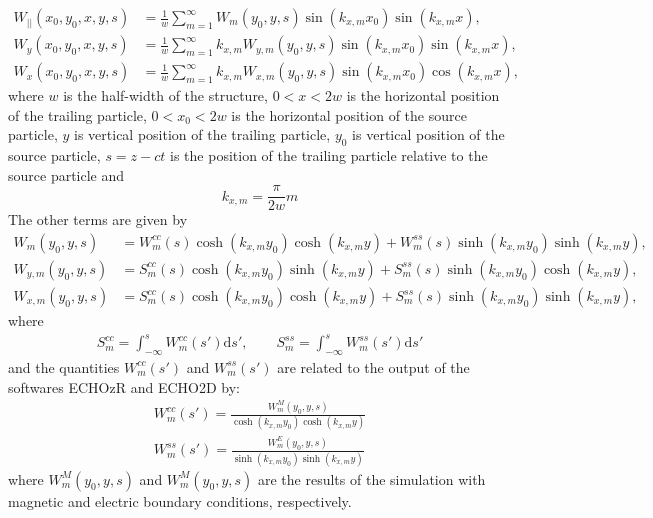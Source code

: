 \begin{apendicesenv}
    \begin{align}
		W_{||}(x_0,y_0,x,y,s) &= \frac1w\sum_{m=1}^\infty W_m(y_0,y,s)\sin(k_{x,m}x_0)\sin(k_{x,m}x), \\
		W_y(x_0,y_0,x,y,s) &= \frac1w\sum_{m=1}^\infty k_{x,m}W_{y,m}(y_0,y,s)\sin(k_{x,m}x_0)\sin(k_{x,m}x), \\
		W_x(x_0,y_0,x,y,s) &= \frac1w\sum_{m=1}^\infty k_{x,m}W_{x,m}(y_0,y,s)\sin(k_{x,m}x_0)\cos(k_{x,m}x),
    \end{align}
    where $w$ is the half-width of the structure, $0<x<2w$ is the horizontal position of the trailing particle, $0<x_0<2w$ is the horizontal position of the source particle, $y$ is vertical position of the trailing particle, $y_0$ is vertical position of the source particle, $s=z-ct$ is the position of the trailing particle relative to the source particle and
    \begin{equation}
    k_{x,m} = \frac{\pi}{2w}m
    \end{equation}
    The other terms are given by
    \begin{align}
		W_m(y_0,y,s)     &= W^{cc}_m(s)\cosh(k_{x,m}y_0)\cosh(k_{x,m}y) + W^{ss}_m(s)\sinh(k_{x,m}y_0)\sinh(k_{x,m}y), \\
		W_{y,m}(y_0,y,s) &= S^{cc}_m(s)\cosh(k_{x,m}y_0)\sinh(k_{x,m}y) + S^{ss}_m(s)\sinh(k_{x,m}y_0)\cosh(k_{x,m}y), \\
		W_{x,m}(y_0,y,s) &= S^{cc}_m(s)\cosh(k_{x,m}y_0)\cosh(k_{x,m}y) + S^{ss}_m(s)\sinh(k_{x,m}y_0)\sinh(k_{x,m}y),
    \end{align}
    where
    \begin{align}
		S^{cc}_m = \int_{-\infty}^s W^{cc}_m(s')\mathrm{d}s', \qquad S^{ss}_m = \int_{-\infty}^s W^{ss}_m(s')\mathrm{d}s'
    \end{align}
    and the quantities $W^{cc}_m(s')$ and $W^{ss}_m(s')$ are related to the output of the softwares ECHOzR and ECHO2D by:
    \begin{align}
		W^{cc}_m(s') = \frac{W_m^M(y_0,y,s)}{\cosh(k_{x,m}y_0)\cosh(k_{x,m}y)} \\
		W^{ss}_m(s') = \frac{W_m^E(y_0,y,s)}{\sinh(k_{x,m}y_0)\sinh(k_{x,m}y)}
    \end{align}
    where $W_m^M(y_0,y,s)$ and $W_m^M(y_0,y,s)$ are the results of the simulation with magnetic and electric boundary conditions, respectively.



\end{apendicesenv}
